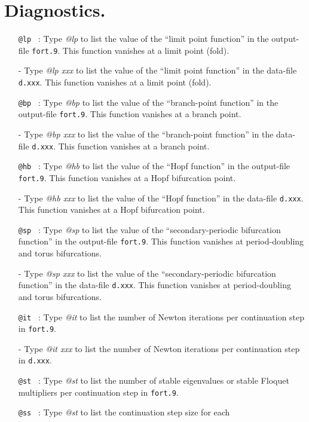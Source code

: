 \documentclass[12pt]{report}
\begin{document}
\section{ Diagnostics.} 

\begin{itemize}
\item[\tt @lp]~:
  Type {\it @lp} to list the value of the ``limit point function'' 
  in the output-file {\tt fort.9}. This function
  vanishes at a limit point (fold).
  \item[-]
  Type {\it @lp xxx} to list the value of the ``limit point function'' 
  in the data-file {\tt d.xxx}. This function
  vanishes at a limit point (fold).
\item[\tt @bp]~:
  Type {\it @bp} to list the value of the ``branch-point function'' 
  in the output-file {\tt fort.9}. This function
  vanishes at a branch point.
  \item[-]
  Type {\it @bp xxx} to list the value of the ``branch-point function''
  in the data-file {\tt d.xxx}. This function
  vanishes at a branch point.
\item[\tt @hb]~:
  Type {\it @hb} to list the value of the ``Hopf function'' 
  in the output-file {\tt fort.9}. This function
  vanishes at a Hopf bifurcation point.
  \item[-]
  Type {\it @hb xxx} to list the value of the ``Hopf function''
  in the data-file {\tt d.xxx}. This function
  vanishes at a  Hopf bifurcation point.
\item[\tt @sp]~:
  Type {\it @sp} to list the value of the 
  ``secondary-periodic bifurcation function'' 
  in the output-file {\tt fort.9}. This function
  vanishes at period-doubling and torus bifurcations.
  \item[-]
  Type {\it @sp xxx} to list the value of the
   ``secondary-periodic bifurcation function''
  in the data-file {\tt d.xxx}. This function
  vanishes at period-doubling and torus bifurcations.
\item[\tt @it]~:
  Type {\it @it} to list the number of Newton iterations per
  continuation step in {\tt fort.9}. 
  \item[-]
   Type {\it @it xxx} to list the number of Newton iterations per
  continuation step in {\tt d.xxx}. 
\item[\tt @st]~:
  Type {\it @st} to list the number of stable eigenvalues or stable
  Floquet multipliers per continuation step in  {\tt fort.9}. 
\item[\tt @ss]~:
  Type {\it @st} to list the continuation step size for each

\end{itemize}
\end{document}
